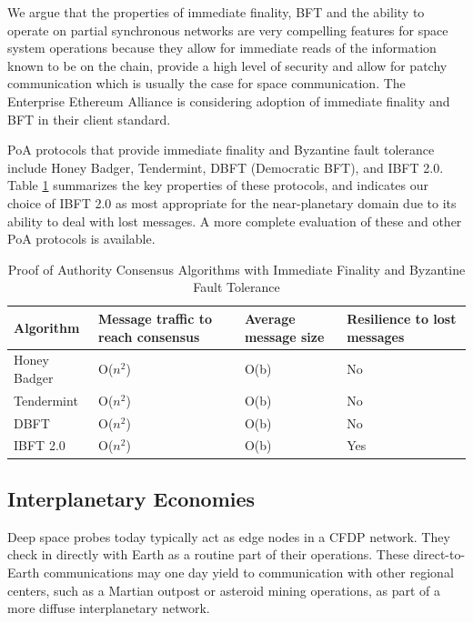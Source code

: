 \documentclass[]{aiaa-tc}%
\begin{document}
We argue that the properties of immediate finality, BFT and the ability to operate on partial synchronous networks are very compelling features for space system operations because they allow for immediate reads of the information known to be on the chain, provide a high level of security and allow for patchy communication which is usually the case for space communication. The Enterprise Ethereum Alliance is considering adoption of immediate finality and BFT in their client standard\cite{eea-enhancedbft}.

PoA protocols that provide immediate finality and Byzantine fault tolerance include Honey Badger\cite{Miller_Xia_Croman_Shi_Song_2016}, Tendermint\cite{Buchman_Kwon_Milosevic_2018}, DBFT (Democratic BFT)\cite{Crain_Gramoli_Larrea_Raynal_2018}, and IBFT 2.0\cite{saltini-ibft2}. Table \ref{t:tab2-poa-algos} summarizes the key properties of these protocols, and indicates our choice of IBFT 2.0 as most appropriate for the near-planetary domain due to its ability to deal with lost messages. A more complete evaluation of these and other PoA protocols is available.\cite{hyland-wood-icssc2019}

\begin{center}
\begin{table}
\caption{Proof of Authority Consensus Algorithms with Immediate Finality and Byzantine Fault Tolerance}
 \label{t:tab2-poa-algos}
\begin{center}
\begin{tabular}{llll}
\hline
Algorithm    & Message traffic to reach consensus & Average message size & Resilience to lost messages \\
\hline
Honey Badger      & O($n^{2}$)    & O(b)   & No   \\
Tendermint       & O($n^{2}$)     & O(b)  & No      \\
DBFT       & O($n^{2}$)     & O(b)  & No      \\
IBFT 2.0 & O($n^{2}$)      & O(b)  & Yes       \\
\hline
\end{tabular}
\end{center}
\end{table}
\end{center}


\subsection{Interplanetary Economies}

Deep space probes today typically act as edge nodes in a CFDP network. They check in directly with Earth as a routine part of their operations. These direct-to-Earth communications may one day yield to communication with other regional centers, such as a Martian outpost or asteroid mining operations, as part of a more diffuse interplanetary network.
\end{document}
